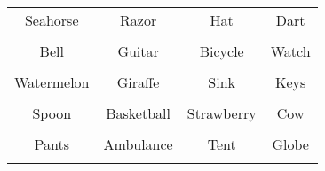 \documentclass[12pt,a4paper]{article}
\begin{document}
\thispagestyle{empty}
\begin{table}[]
\centering
\Huge
\begin{tabular}{cccc}
 Seahorse& Razor& Hat& Dart\\  & & & \\
 Bell& Guitar& Bicycle& Watch\\  & & & \\
 Watermelon& Giraffe& Sink& Keys\\  & & & \\
 Spoon& Basketball& Strawberry& Cow\\  & & & \\
 Pants& Ambulance& Tent& Globe\\  & & & \\
\end{tabular}
\end{table}
\end{document}
